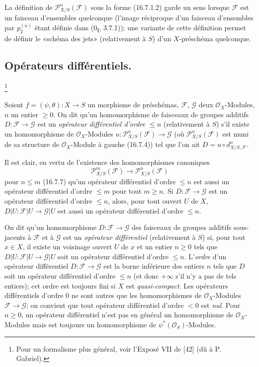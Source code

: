 \begin{remark}[16.7.10]
\label{IV.16.7.10}
La définition de $\mathscr{P}_{X/S}^n(\mathscr{F})$ sous la forme (16.7.1.2)
garde un sens lorsque $\mathscr{F}$ est un faisceau d'ensembles quelconque
(l'image réciproque d'un faisceau d'ensembles par $p_2^{(n)}$ étant définie
dans (0\textsubscript{I}, 3.7.1)); une variante de cette définition permet de
définir le «schéma des jets» (relativement à $S$) d'un $X$-préschéma
quelconque.
\end{remark}

\subsection{Opérateurs différentiels.}
\footnote{Pour un formalisme plus général, voir l'Exposé VII de [42]
(dû à P. Gabriel).}

\begin{definition}[16.8.1]
Soient $f=(\psi,\theta):X\to S$ un morphisme de préschémas,
$\mathscr{F}$, $\mathscr{G}$ deux $\mathcal{O}_X$-Modules, $n$ un entier
$\geq0$. On dit qu'un homomorphisme de faisceaux de groupes additifs
$D:\mathscr{F}\to\mathscr{G}$ est un \emph{opérateur différentiel d'ordre
$\leq n$} (relativement à $S$) s'il existe un homomorphisme de
$\mathcal{O}_X$-Modules
$u:\mathscr{P}_{X/S}^n(\mathscr{F})\to\mathscr{G}$ (où
$\mathscr{P}_{X/S}^n(\mathscr{F})$ est muni de sa structure de
$\mathcal{O}_X$-Module à gauche (16.7.4)) tel que l'on ait
$D=u\circ d_{X/S,\mathscr{F}}^n$.
\end{definition}

Il est clair, en vertu de l'existence des homomorphismes canoniques
\[
  \mathscr{P}_{X/S}^m(\mathscr{F})
  \longrightarrow\mathscr{P}_{X/S}^n(\mathscr{F})
\]
pour $n\leq m$ (16.7.7) qu'un opérateur différentiel d'ordre $\leq n$ est
aussi un opérateur différentiel d'ordre $\leq m$ pour tout $m\geq n$. Si
$D:\mathscr{F}\to\mathscr{G}$ est un opérateur différentiel d'ordre
$\leq n$, alors, pour tout ouvert $U$ de $X$,
$D|U:\mathscr{F}|U\to\mathscr{G}|U$ est aussi un opérateur différentiel
d'ordre $\leq n$.

On dit qu'un homomorphisme $D:\mathscr{F}\to\mathscr{G}$ des faisceaux de
groupes additifs sous-jacents à $\mathscr{F}$ et à $\mathscr{G}$ est un
\emph{opérateur différentiel} (relativement à $S$) si, pour tout $x\in X$, il
existe un voisinage ouvert $U$ de $x$ et un entier $n\geq0$ tels que
$D|U:\mathscr{F}|U\to\mathscr{G}|U$ soit un opérateur différentiel d'ordre
$\leq n$. L'\emph{ordre} d'un opérateur différentiel
$D:\mathscr{F}\to\mathscr{G}$ est la borne inférieure des entiers $n$ tels
que $D$ soit un opérateur différentiel d'ordre $\leq n$ (et donc $+\infty$
s'il n'y a pas de tels entiers); cet ordre est toujours fini si $X$ est
\emph{quasi-compact}. Les opérateurs différentiels d'ordre $0$ ne sont autres
que les homomorphismes de $\mathcal{O}_X$-Modules
$\mathscr{F}\to\mathscr{G}$; on convient que tout opérateur différentiel
d'ordre $<0$ est \emph{nul}. Pour $n\geq0$, un opérateur différentiel n'est
pas en général un homomorphisme de $\mathcal{O}_X$-Modules mais est toujours
un homomorphisme de $\psi^*(\mathcal{O}_S)$-Modules.

